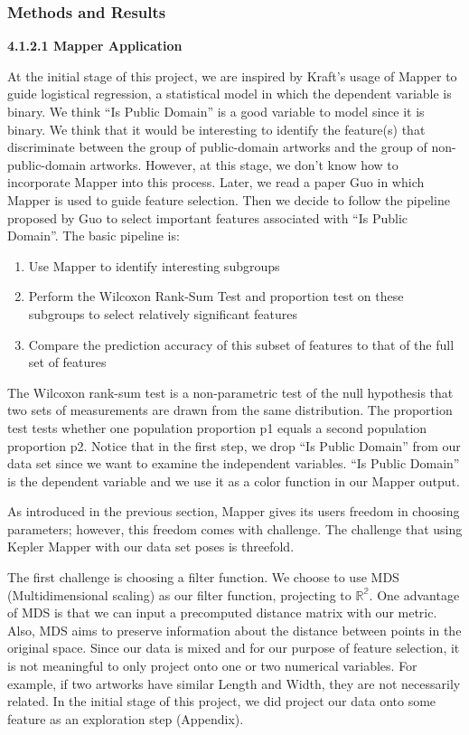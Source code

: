 \documentclass[12pt]{article}
\theoremstyle{definition}
\begin{document}
\subsubsection{Methods and Results}
\textbf{4.1.2.1 Mapper Application}
\newline
\par At the initial stage of this project, we are inspired by Kraft's usage\cite{kraft2016thesis} of Mapper to guide logistical regression, a statistical model in which the dependent variable is binary. We think ``Is Public Domain'' is a good variable to model since it is binary. We think that it would be interesting to identify the feature(s) that discriminate between the group of public-domain artworks and the group of non-public-domain artworks. However, at this stage, we don't know how to incorporate Mapper into this process. Later, we read a paper Guo\cite{guo2017manu} in which Mapper is used to guide feature selection. Then we decide to follow the pipeline proposed by Guo to select important features associated with ``Is Public Domain''. The basic pipeline is: 
\begin{enumerate}
\item Use Mapper to identify interesting subgroups
\item Perform the Wilcoxon Rank-Sum Test and proportion test on these subgroups to select relatively significant features
\item Compare the prediction accuracy of this subset of features to that of the full set of features
\end{enumerate}
\par The Wilcoxon rank-sum test is a non-parametric test of the null hypothesis that two sets of measurements are drawn from the same distribution\cite{scipy}. The proportion test tests whether one population proportion p1 equals a second population proportion p2\cite{proportiontest}. Notice that in the first step, we drop ``Is Public Domain'' from our data set since we want to examine the independent variables. ``Is Public Domain'' is the dependent variable and we use it as a color function in our Mapper output.
\newline
\par As introduced in the previous section, Mapper gives its users freedom in choosing parameters; however, this freedom comes with challenge. The challenge that using Kepler Mapper with our data set poses is threefold. 
\newline
\par The first challenge is choosing a filter function. We choose to use MDS (Multidimensional scaling)\cite{BorgGroenen2005} as our filter function, projecting to $\mathbb{R^2}$. One advantage of MDS is that we can input a precomputed distance matrix with our metric. Also, MDS aims to preserve information about the distance between points in the original space. Since our data is mixed and for our purpose of feature selection, it is not meaningful to only project onto one or two numerical variables. For example, if two artworks have similar Length and Width, they are not necessarily related. In the initial stage of this project, we did project our data onto some feature as an exploration step (Appendix). 
\end{document}
